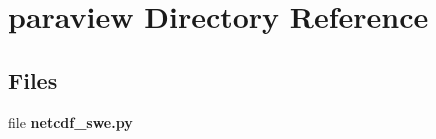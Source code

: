 \section{paraview Directory Reference}
\label{dir_f920ce4380035744833c2036fa92c62b}
\subsection*{Files}
\begin{DoxyCompactItemize}
\item 
file {\bfseries netcdf\-\_\-swe.\-py}
\end{DoxyCompactItemize}
